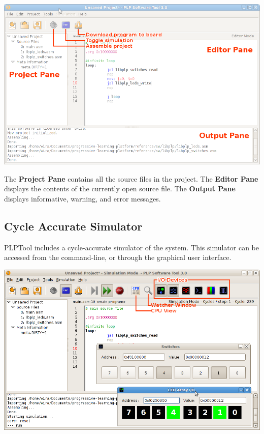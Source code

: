 \documentclass{article}
\begin{document}
\begin{center}
\includegraphics[scale=0.5]{../../images/plptool/plptool30_editor_view.png}
\end{center}

The \textbf{Project Pane} contains all the source files in the project. 
The \textbf{Editor Pane} displays the contents of the currently open source 
file. The \textbf{Output Pane} displays informative, warning, and error 
messages. 
\subsection{Cycle Accurate Simulator}
PLPTool includes a cycle-accurate simulator of the system. This simulator can be accessed from the command-line, or through the graphical user interface. 

\begin{center}
\includegraphics[scale=0.5]{../../images/plptool/plptool30_simulation_mode.png}
\end{center}
\end{document}
